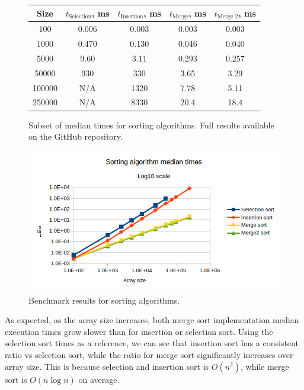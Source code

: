 \documentclass[a4paper,11pt]{article}
\begin{document}
    \begin{figure}[H]
        \centering
        
        \begin{tabular}{c|c|c|c|c}
            Size & $t_\text{Selection}$, ms & $t_\text{Insertion}$, ms & $t_\text{Merge}$, ms & $t_\text{Merge 2}$, ms \\
            \hline
            \hline
            100 & 0.006 & 0.003 & 0.003 & 0.003 \\
            \hline
            1000 & 0.470 & 0.130 & 0.046 & 0.040 \\
            \hline
            5000 & 9.60 & 3.11 & 0.293 & 0.257 \\
            \hline
            50000 & 930 & 330 & 3.65 & 3.29 \\
            \hline
            100000 & N/A & 1320 & 7.78 & 5.11 \\
            \hline
            250000 & N/A & 8330 & 20.4 & 18.4 \\
        \end{tabular}

        \caption{Subset of median times for sorting algorithms. Full results available on the GitHub repository.}
    \end{figure}

    \begin{figure}[H]
        \centering
        \includegraphics[width=\textwidth]{sorting.png}
        \caption{Benchmark results for sorting algorithms.}
        \label{fig:sorting}
    \end{figure}

    As expected, as the array size increases, both merge sort implementation median execution times grow slower than for insertion or selection sort. Using the selection sort times as a reference, we can see that insertion sort has a consistent ratio vs selection sort, while the ratio for merge sort significantly increases over array size. This is because selection and insertion sort is $O(n^2)$, while merge sort is $O(n \log n)$ on average.
\end{document}
